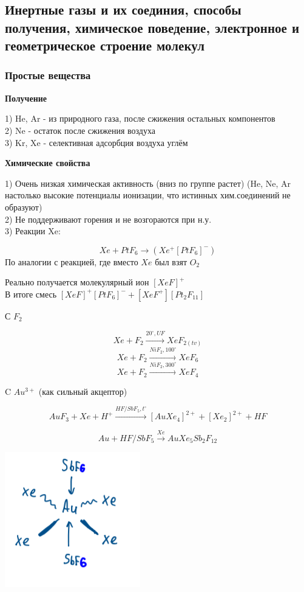 
\subsection{Инертные газы и их соединия, способы получения, химическое поведение, электронное и геометрическое строение молекул}

\subsubsection*{Простые вещества}

\textbf{Получение}

1) He, Ar - из природного газа, после сжижения остальных компонентов\\
2) Ne - остаток после сжижения воздуха\\
3) Kr, Xe - селективная адсорбция воздуха углём

\textbf{Химические свойства}

1) Очень низкая химическая активность (вниз по группе растет) (He, Ne, Ar настолько высокие потенциалы ионизации, что истинных хим.соединений не образуют)\\
2) Не поддерживают горения и не возгораются при н.у.\\
3) Реакции Xe:

$$Xe + PtF_6 \rightarrow (Xe^+[PtF_6]^-)$$
По аналогии с реакцией, где вместо $Xe$ был взят $O_2$

Реально получается молекулярный ион $[XeF]^+$\\
В итоге смесь $[XeF]^+[PtF_6]^- + [XeF^+][Pt_2F_{11}]$

С $F_2$

$$Xe + F_2 \xrightarrow{20^{\circ}, UF} XeF_{2(tv)}$$
$$Xe + F_2 \xrightarrow{NiF_2, 100^{\circ}} XeF_6$$
$$Xe + F_2 \xrightarrow{NiF_2, 300^{\circ}}XeF_4$$

C $Au^{3+}$ (как сильный акцептор)

$$AuF_3 + Xe + H^+ \xrightarrow{HF/SbF_5, t^{\circ}} [AuXe_4]^{2+} + [Xe_2]^{2+} + HF$$

$$Au + HF/SbF_5 \xrightarrow{Xe} AuXe_5Sb_2F_{12}$$ 

\includegraphics[scale=0.8]{images/13v1.png}

